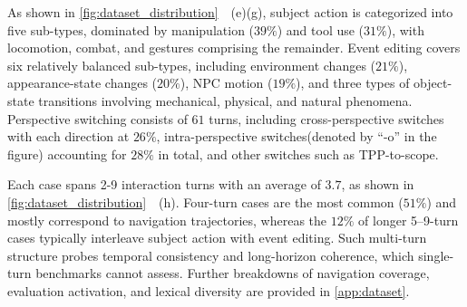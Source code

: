 As shown in \cref{fig:dataset_distribution}~~(e)(g), subject action is categorized into five sub-types, dominated by manipulation ($39\%$) and tool use ($31\%$), with locomotion, combat, and gestures comprising the remainder. Event editing covers six relatively balanced sub-types, including environment changes ($21\%$), appearance-state changes ($20\%$), NPC motion ($19\%$), and three types of object-state transitions involving mechanical, physical, and natural phenomena. Perspective switching consists of $61$ turns, including cross-perspective switches with each direction at $26\%$, intra-perspective switches(denoted by ``-o'' in the figure) accounting for $28\%$ in total, and other switches such as TPP-to-scope.

Each case spans 2-9 interaction turns with an average of $3.7$, as shown in \cref{fig:dataset_distribution}~~(h). Four-turn cases are the most common ($51\%$) and mostly correspond to navigation trajectories, whereas the $12\%$ of longer 5--9-turn cases typically interleave subject action with event editing. Such multi-turn structure probes temporal consistency and long-horizon coherence, which single-turn benchmarks cannot assess. Further breakdowns of navigation coverage, evaluation activation, and lexical diversity are provided in \cref{app:dataset}.
